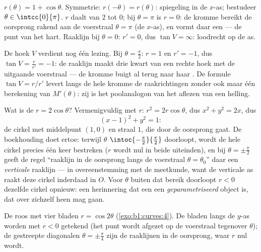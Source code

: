 \begin{example}[De cardioïde]\label{ex:b1:curves:cardioid}
$r(\theta) = 1 + \cos\theta$. Symmetrie:
$r(-\theta) = r(\theta)$: spiegeling in de $x$-as; bestudeer
$\theta \in \intcc{0}{\pi}$. $r$ daalt van $2$ tot $0$; bij $\theta
= \pi$ is $r = 0$: de kromme bereikt de oorsprong rakend aan de
voerstraal $\theta = \pi$ (de $x$-as), en vormt daar een 
--- de punt van het hart. Raaklijn bij $\theta = 0$: $r' = 0$, dus
$\tan V = \infty$: loodrecht op de as.

De hoek $V$ verdient nog één lezing. Bij $\theta = \frac\pi2$: $r
= 1$ en $r' = -1$, dus $\tan V = \frac{r}{r'} = -1$: de raaklijn
maakt drie kwart van een rechte hoek met de uitgaande
voerstraal --- de kromme buigt al terug naar haar . De
formule $\tan V = r/r'$ levert langs de hele kromme de
raakrichtingen zonder ook maar één berekening van $M'(\theta)$:
zij is het poolanalogon van het aflezen van een helling.
\end{example}

\begin{example}
\label{ex:b1:curves:polarcircle}
Wat is de  $r = 2\cos\theta$? Vermenigvuldig met $r$:
$r^2 = 2r\cos\theta$, dus $x^2 + y^2 = 2x$, dus
\[
(x - 1)^2 + y^2 = 1 :
\]
de cirkel met middelpunt $(1, 0)$ en straal $1$, die door de
oorsprong gaat. De boekhouding doet ertoe: terwijl $\theta$
$\intoc{-\frac\pi2}{\frac\pi2}$ doorloopt, wordt de hele cirkel
precies één keer bestreken ($r$ wordt nul in beide uiteinden), en
bij $\theta = \pm\frac\pi2$ geeft de regel ``raaklijn in de
oorsprong langs de voerstraal $\theta = \theta_0$'' daar een
\emph{verticale} raaklijn --- in overeenstemming met de meetkunde,
want de verticale as raakt deze cirkel inderdaad in $O$. Voor
$\theta$ buiten dat bereik doorloopt $r < 0$ dezelfde cirkel
opnieuw: een herinnering dat een  een
\emph{geparametriseerd} object is, dat over zichzelf heen mag
gaan.
\end{example}

\begin{omfigure}

{\small De roos met vier bladen $r = \cos 2\theta$
(\cref{exo:b1:curves:4}). De bladen langs de $y$-as worden met $r <
0$ getekend (het punt wordt afgezet op de voerstraal tegenover
$\theta$); de gestreepte diagonalen $\theta = \pm\frac\pi4$ zijn de
raaklijnen in de oorsprong, waar $r$ nul wordt.}
\end{omfigure}

